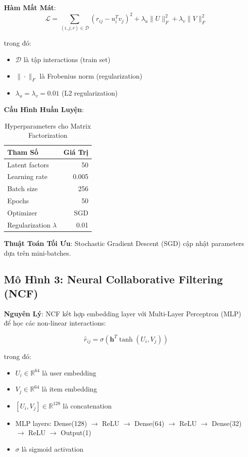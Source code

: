 \documentclass[12pt,a4paper]{article}
\begin{document}
\textbf{Hàm Mất Mát}:
\begin{equation}
\mathcal{L} = \sum_{(i,j,r) \in \mathcal{D}} (r_{ij} - u_i^T v_j)^2 + \lambda_u \|U\|_F^2 + \lambda_v \|V\|_F^2
\end{equation}

trong đó:
\begin{itemize}
    \item $\mathcal{D}$ là tập interactions (train set)
    \item $\|\cdot\|_F$ là Frobenius norm (regularization)
    \item $\lambda_u = \lambda_v = 0.01$ (L2 regularization)
\end{itemize}

\textbf{Cấu Hình Huấn Luyện}:

\begin{table}[H]
\centering
\begin{tabular}{|l|r|}
\hline
\textbf{Tham Số} & \textbf{Giá Trị} \\
\hline
Latent factors & 50 \\
Learning rate & 0.005 \\
Batch size & 256 \\
Epochs & 50 \\
Optimizer & SGD \\
Regularization $\lambda$ & 0.01 \\
\hline
\end{tabular}
\caption{Hyperparameters cho Matrix Factorization}
\end{table}

\textbf{Thuật Toán Tối Ưu}: Stochastic Gradient Descent (SGD) cập nhật parameters dựa trên mini-batches.

\subsection{Mô Hình 3: Neural Collaborative Filtering (NCF)}

\textbf{Nguyên Lý}: NCF kết hợp embedding layer với Multi-Layer Perceptron (MLP) để học các non-linear interactions:

\begin{equation}
\hat{r}_{ij} = \sigma(\mathbf{h}^T \tanh(U_i, V_j))
\end{equation}

trong đó:
\begin{itemize}
    \item $U_i \in \mathbb{R}^{64}$ là user embedding
    \item $V_j \in \mathbb{R}^{64}$ là item embedding
    \item $[U_i, V_j] \in \mathbb{R}^{128}$ là concatenation
    \item MLP layers: Dense(128) $\to$ ReLU $\to$ Dense(64) $\to$ ReLU $\to$ Dense(32) $\to$ ReLU $\to$ Output(1)
    \item $\sigma$ là sigmoid activation
\end{itemize}
\end{document}
